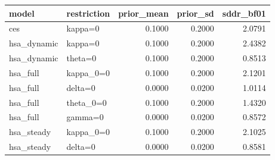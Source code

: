 \begin{tabular}{llrrr}
\toprule
model & restriction & prior\_mean & prior\_sd & sddr\_bf01 \\
\midrule
ces & kappa=0 & 0.1000 & 0.2000 & 2.0791 \\
hsa\_dynamic & kappa=0 & 0.1000 & 0.2000 & 2.4382 \\
hsa\_dynamic & theta=0 & 0.1000 & 0.2000 & 0.8513 \\
hsa\_full & kappa\_0=0 & 0.1000 & 0.2000 & 2.1201 \\
hsa\_full & delta=0 & 0.0000 & 0.0200 & 1.0114 \\
hsa\_full & theta\_0=0 & 0.1000 & 0.2000 & 1.4320 \\
hsa\_full & gamma=0 & 0.0000 & 0.0200 & 0.8572 \\
hsa\_steady & kappa\_0=0 & 0.1000 & 0.2000 & 2.1025 \\
hsa\_steady & delta=0 & 0.0000 & 0.0200 & 0.8581 \\
\bottomrule
\end{tabular}
